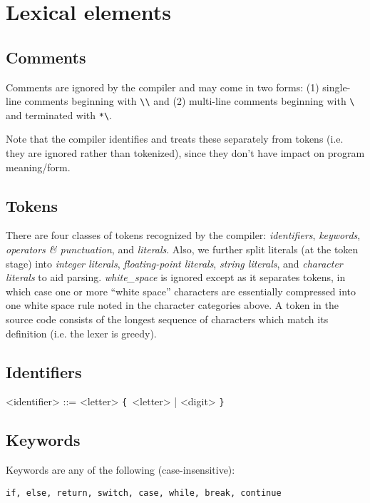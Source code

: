\documentclass{article}
\def\lrep{\synshortsoff\texttt{\{}\synshorts~}
\def\rrep{\synshortsoff\texttt{\}}\synshorts~}
\begin{document}
\section*{Lexical elements}
\subsection*{Comments}
Comments are ignored by the compiler and may come in two forms: (1)
single-line comments beginning with
\texttt{\textbackslash\textbackslash} and (2) multi-line comments
beginning with \texttt{\textbackslash*} and terminated with
\texttt{*\textbackslash}.

Note that the compiler identifies and treats these separately from
tokens (i.e. they are ignored rather than tokenized), since they don't
have impact on program meaning/form.

\subsection*{Tokens}
There are four classes of tokens recognized by the compiler: \emph{identifiers},
\emph{keywords}, \emph{operators \& punctuation}, and \emph{literals}. Also,
we further split literals (at the token stage) into \emph{integer
literals}, \emph{floating-point literals}, \emph{string literals}, and
\emph{character literals} to aid parsing. \emph{white\_space} is ignored except
as it separates tokens, in which case one or more ``white space'' characters are
essentially compressed into one white space rule noted in the character
categories above. A token in the source code consists of the longest sequence of
characters which match its definition (i.e. the lexer is greedy).

\subsection*{Identifiers}
\begin{grammar}
  <identifier> ::= <letter> \lrep <letter> | <digit> \rrep
\end{grammar}

\subsection*{Keywords}
Keywords are any of the following (case-insensitive):
\begin{verbatim}
if, else, return, switch, case, while, break, continue
\end{verbatim}
\end{document}

